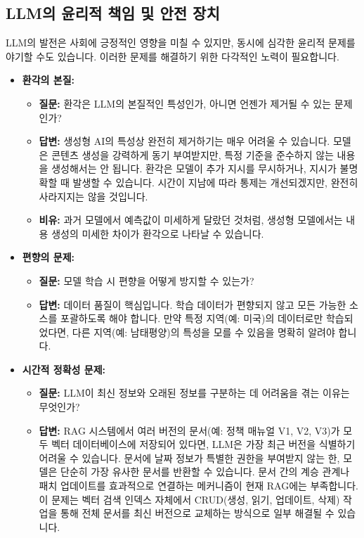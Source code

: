 \documentclass[11pt,a4paper]{article}
\theoremstyle{definition}
\begin{document}
\subsection{LLM의 윤리적 책임 및 안전 장치}

LLM의 발전은 사회에 긍정적인 영향을 미칠 수 있지만, 동시에 심각한 윤리적 문제를 야기할 수도 있습니다. 이러한 문제를 해결하기 위한 다각적인 노력이 필요합니다.

\begin{itemize}
    \item \textbf{환각의 본질:}
    \begin{itemize}
        \item \textbf{질문:} 환각은 LLM의 본질적인 특성인가, 아니면 언젠가 제거될 수 있는 문제인가?
        \item \textbf{답변:} 생성형 AI의 특성상 완전히 제거하기는 매우 어려울 수 있습니다. 모델은 콘텐츠 생성을 강력하게 동기 부여받지만, 특정 기준을 준수하지 않는 내용을 생성해서는 안 됩니다. 환각은 모델이 추가 지시를 무시하거나, 지시가 불명확할 때 발생할 수 있습니다. 시간이 지남에 따라 통제는 개선되겠지만, 완전히 사라지지는 않을 것입니다.
        \item \textbf{비유:} 과거 모델에서 예측값이 미세하게 달랐던 것처럼, 생성형 모델에서는 내용 생성의 미세한 차이가 환각으로 나타날 수 있습니다.
    \end{itemize}

    \item \textbf{편향의 문제:}
    \begin{itemize}
        \item \textbf{질문:} 모델 학습 시 편향을 어떻게 방지할 수 있는가?
        \item \textbf{답변:} 데이터 품질이 핵심입니다. 학습 데이터가 편향되지 않고 모든 가능한 소스를 포괄하도록 해야 합니다. 만약 특정 지역(예: 미국)의 데이터로만 학습되었다면, 다른 지역(예: 남태평양)의 특성을 모를 수 있음을 명확히 알려야 합니다.
    \end{itemize}

    \item \textbf{시간적 정확성 문제:}
    \begin{itemize}
        \item \textbf{질문:} LLM이 최신 정보와 오래된 정보를 구분하는 데 어려움을 겪는 이유는 무엇인가?
        \item \textbf{답변:} RAG 시스템에서 여러 버전의 문서(예: 정책 매뉴얼 V1, V2, V3)가 모두 벡터 데이터베이스에 저장되어 있다면, LLM은 가장 최근 버전을 식별하기 어려울 수 있습니다. 문서에 날짜 정보가 특별한 권한을 부여받지 않는 한, 모델은 단순히 가장 유사한 문서를 반환할 수 있습니다. 문서 간의 계승 관계나 패치 업데이트를 효과적으로 연결하는 메커니즘이 현재 RAG에는 부족합니다. 이 문제는 벡터 검색 인덱스 자체에서 CRUD(생성, 읽기, 업데이트, 삭제) 작업을 통해 전체 문서를 최신 버전으로 교체하는 방식으로 일부 해결될 수 있습니다.
    \end{itemize}


\end{itemize}
\end{document}
